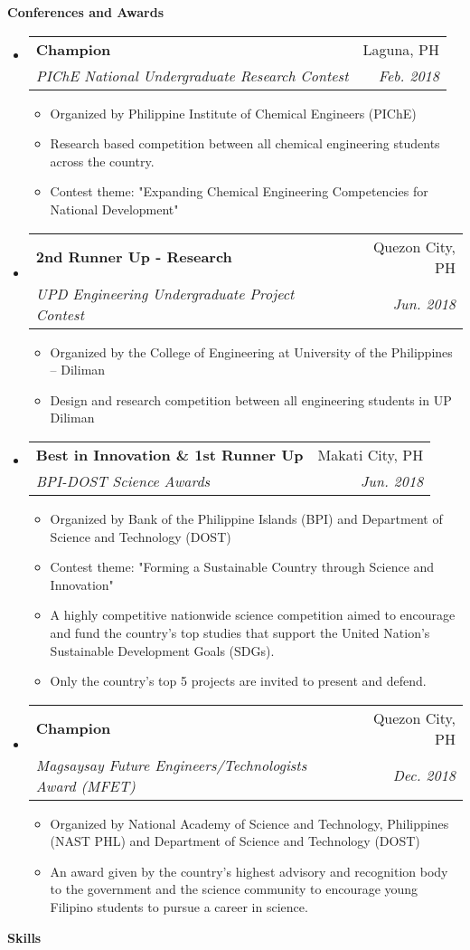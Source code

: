 \documentclass[letterpaper,11pt]{article}
\makeatletter
\newcommand{\resitem}[1]{\item #1 \vspace{-2pt}}
\newcommand{\resheading}[1]{{\large \colorbox{mygrey}{\begin{minipage}{\textwidth}{\textbf{#1 \vphantom{p\^{E}}}}\end{minipage}}}}
\newcommand{\ressubheading}[4]{
\begin{tabular*}{6.55in}{l@{\extracolsep{\fill}}r}
		\textbf{#1} & #2 \\
		\textit{#3} & \textit{#4} \\
\end{tabular*}\vspace{-6pt}}
\makeatother
\begin{document}
\resheading{Conferences and Awards}
\begin{itemize}
	\item
	\ressubheading{Champion}{Laguna, PH}{PIChE National Undergraduate Research Contest}{Feb. 2018}
		\begin{itemize}
			\resitem{Organized by Philippine Institute of Chemical Engineers (PIChE)}
			\resitem{Research based competition between all chemical engineering students across the country.}
			\resitem{Contest theme: "Expanding Chemical Engineering Competencies for National Development"}
		\end{itemize}
	\item
	\ressubheading{2nd Runner Up - Research}{Quezon City, PH}{UPD Engineering Undergraduate Project Contest}{Jun. 2018}
		\begin{itemize}
			\resitem{Organized by the College of Engineering at University of the Philippines – Diliman}
			\resitem{Design and research competition between all engineering students in UP Diliman}
		\end{itemize}
	\item
	\ressubheading{Best in Innovation \& 1st Runner Up}{Makati City, PH}{BPI-DOST Science Awards}{Jun. 2018}
		\begin{itemize}
			\resitem{Organized by Bank of the Philippine Islands (BPI) and Department of Science and Technology (DOST)}
			\resitem{Contest theme: "Forming a Sustainable Country through Science and Innovation"}
			\resitem{A highly competitive nationwide science competition aimed to encourage and fund the country's top studies that support the 
			United Nation's Sustainable Development Goals (SDGs).}
			\resitem{Only the country's top 5 projects are invited to present and defend.}
		\end{itemize}
	\item
	\ressubheading{Champion}{Quezon City, PH}{Magsaysay Future Engineers/Technologists Award (MFET)}{Dec. 2018}
		\begin{itemize}
			\resitem{Organized by National Academy of Science and Technology, Philippines (NAST PHL) and Department of Science and Technology (DOST)}
			\resitem{An award given by the country’s highest advisory and recognition body to the 
			government and the science community to encourage young Filipino students to pursue a career in science.}
		\end{itemize}
\end{itemize}

\resheading{Skills}
\end{document}
